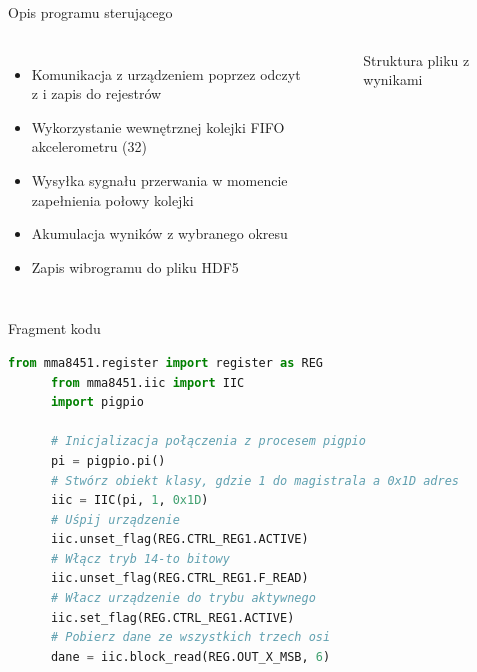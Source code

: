 \documentclass[aspectratio=1610,polish]{beamer} %
\begin{document}
  \begin{frame}{Opis programu sterującego}
    \begin{columns}
      \begin{itemize}
        \item Komunikacja z urządzeniem poprzez odczyt z i zapis do rejestrów
        \item Wykorzystanie wewnętrznej kolejki FIFO akcelerometru (\SI{32}{\bit})
        \item Wysyłka sygnału przerwania w momencie zapełnienia połowy kolejki
        \item Akumulacja wyników z wybranego okresu
        \item Zapis wibrogramu do pliku HDF5
      \end{itemize}
      \begin{figure}
      \begin{minipage}{\textwidth}
      \end{minipage}
      \caption{Struktura pliku z wynikami}
      \end{figure}
    \end{columns}
  \end{frame}
  \begin{frame}[fragile]{Fragment kodu}
    \begin{lstlisting}[language=Python]
      from mma8451.register import register as REG
      from mma8451.iic import IIC
      import pigpio
  
      # Inicjalizacja połączenia z procesem pigpio
      pi = pigpio.pi()
      # Stwórz obiekt klasy, gdzie 1 do magistrala a 0x1D adres
      iic = IIC(pi, 1, 0x1D)
      # Uśpij urządzenie
      iic.unset_flag(REG.CTRL_REG1.ACTIVE)
      # Włącz tryb 14-to bitowy
      iic.unset_flag(REG.CTRL_REG1.F_READ)
      # Włacz urządzenie do trybu aktywnego
      iic.set_flag(REG.CTRL_REG1.ACTIVE)
      # Pobierz dane ze wszystkich trzech osi
      dane = iic.block_read(REG.OUT_X_MSB, 6)\end{lstlisting}
  \end{frame}
\end{document}
